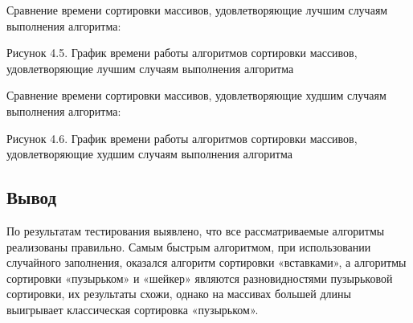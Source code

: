 \documentclass[12pt]{report}
\begin{document}
Сравнение времени сортировки массивов, удовлетворяющие лучшим случаям выполнения алгоритма:  \\
	
\begin{center}
  	Рисунок 4.5. График времени работы алгоритмов сортировки массивов, удовлетворяющие лучшим случаям выполнения алгоритма
	\end{center}
	
Сравнение времени сортировки массивов, удовлетворяющие худшим  случаям выполнения алгоритма: \\
	
\begin{center}
  	Рисунок 4.6. График времени работы алгоритмов сортировки массивов, удовлетворяющие худшим случаям выполнения алгоритма
	\end{center}
	
\subsection{Вывод}
По результатам тестирования выявлено, что все рассматриваемые алгоритмы реализованы правильно. Самым быстрым алгоритмом, при использовании случайного заполнения, оказался алгоритм сортировки «вставками», а алгоритмы сортировки «пузырьком» и «шейкер» являются разновидностями пузырьковой сортировки, их результаты схожи, однако на массивах большей длины выигрывает классическая сортировка «пузырьком». 
\end{document}
